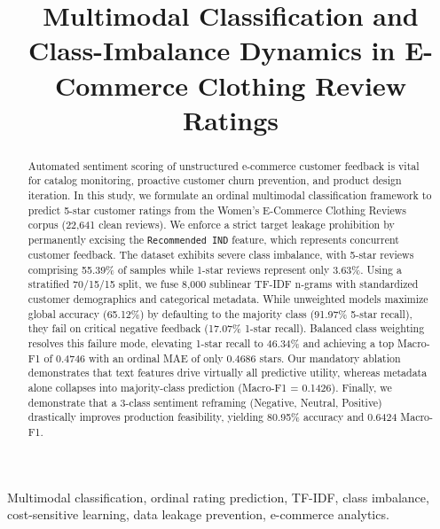 \documentclass[conference]{IEEEtran}
\begin{document}
\title{Multimodal Classification and Class-Imbalance Dynamics in E-Commerce Clothing Review Ratings}

\author{
}

\maketitle

\begin{abstract}
Automated sentiment scoring of unstructured e-commerce customer feedback is vital for catalog monitoring, proactive customer churn prevention, and product design iteration. In this study, we formulate an ordinal multimodal classification framework to predict 5-star customer ratings from the Women's E-Commerce Clothing Reviews corpus (22,641 clean reviews). We enforce a strict target leakage prohibition by permanently excising the \texttt{Recommended IND} feature, which represents concurrent customer feedback. The dataset exhibits severe class imbalance, with 5-star reviews comprising 55.39\% of samples while 1-star reviews represent only 3.63\%. Using a stratified 70/15/15 split, we fuse 8,000 sublinear TF-IDF n-grams with standardized customer demographics and categorical metadata. While unweighted models maximize global accuracy (65.12\%) by defaulting to the majority class (91.97\% 5-star recall), they fail on critical negative feedback (17.07\% 1-star recall). Balanced class weighting resolves this failure mode, elevating 1-star recall to 46.34\% and achieving a top Macro-F1 of 0.4746 with an ordinal MAE of only 0.4686 stars. Our mandatory ablation demonstrates that text features drive virtually all predictive utility, whereas metadata alone collapses into majority-class prediction (Macro-F1 = 0.1426). Finally, we demonstrate that a 3-class sentiment reframing (Negative, Neutral, Positive) drastically improves production feasibility, yielding 80.95\% accuracy and 0.6424 Macro-F1.
\end{abstract}

\begin{IEEEkeywords}
Multimodal classification, ordinal rating prediction, TF-IDF, class imbalance, cost-sensitive learning, data leakage prevention, e-commerce analytics.
\end{IEEEkeywords}
\end{document}
